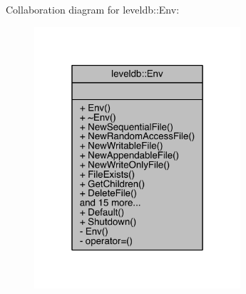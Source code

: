 Collaboration diagram for leveldb\+:\+:Env\+:\nopagebreak
\begin{figure}[H]
\begin{center}
\leavevmode
\includegraphics[width=217pt]{classleveldb_1_1_env__coll__graph}
\end{center}
\end{figure}
